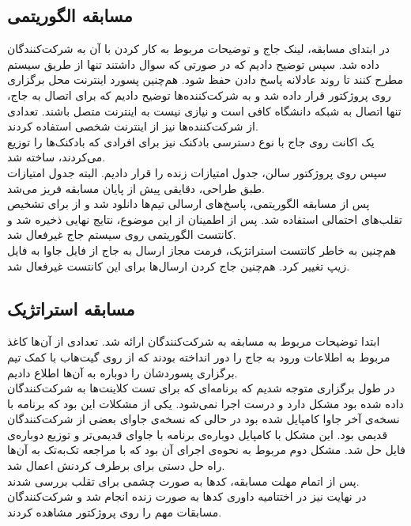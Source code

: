 \documentclass{report}
\begin{document}
\subsection{مسابقه الگوریتمی}
در ابتدای مسابقه، لینک جاج و توضیحات مربوط به کار کردن با آن به شرکت‌کنندگان داده شد. سپس توضیح دادیم که در صورتی که سوال داشتند تنها از طریق سیستم  مطرح کنند تا روند عادلانه پاسخ دادن حفظ شود. هم‌چنین پسورد اینترنت محل برگزاری روی پروژکتور قرار داده شد و به شرکت‌کننده‌ها توضیح دادیم که برای اتصال به جاج، تنها اتصال به شبکه دانشگاه کافی است و نیازی نیست به اینترنت متصل باشند. تعدادی از شرکت‌کننده‌ها نیز از اینترنت شخصی استفاده کردند. \\
یک اکانت روی جاج با نوع دسترسی بادکنک نیز برای افرادی که بادکنک‌ها را توزیع‌ می‌کردند، ساخته شد. \\
سپس روی پروژکتور سالن، جدول امتیازات زنده را قرار دادیم. البته جدول امتیازات طبق طراحی، دقایقی پیش از پایان مسابقه فریز می‌شد. \\
پس از مسابقه الگوریتمی، پاسخ‌های ارسالی تیم‌ها دانلود شد و از  برای تشخیص تقلب‌های احتمالی استفاده شد. پس از اطمینان از این موضوع، نتایج نهایی ذخیره شد و کانتست الگوریتمی روی سیستم جاج غیرفعال شد. \\
هم‌چنین به خاطر کانتست استراتژیک، فرمت‌ مجاز ارسال به جاج از فایل جاوا به فایل زیپ تغییر کرد. هم‌چنین جاج کردن ارسال‌ها برای این کانتست غیرفعال شد.
\subsection{مسابقه استراتژیک}
ابتدا توضیحات مربوط به مسابقه به شرکت‌کنندگان ارائه شد. تعدادی از آن‌ها کاغذ مربوط به اطلاعات ورود به جاج را دور انداخته بودند که از روی گیت‌هاب با کمک تیم برگزاری پسوردشان را دوباره به آن‌ها اطلاع دادیم. \\
در طول برگزاری متوجه شدیم که برنامه‌ای که برای تست کلاینت‌ها به شرکت‌کنندگان داده شده بود مشکل دارد و درست اجرا نمی‌شود. یکی از مشکلات این بود که برنامه با نسخه‌ی آخر جاوا کامپایل شده بود در حالی که نسخه‌ی جاوای بعضی از شرکت‌کنندگان قدیمی بود. این مشکل با کامپایل دوباره‌ی برنامه با جاوای قدیمی‌تر و توزیع دوباره‌ی فایل حل شد. مشکل دوم مربوط به نحوه‌ی اجرای آن بود که با مراجعه تک‌به‌تک به آن‌ها راه حل دستی برای برطرف کردنش اعمال شد. \\
پس از اتمام مهلت مسابقه، کدها به صورت چشمی برای تقلب بررسی شدند. \\
در نهایت نیز در اختتامیه داوری کدها به صورت زنده انجام شد و شرکت‌کنندگان مسابقات مهم را روی پروژکتور مشاهده کردند. \\
\end{document}
